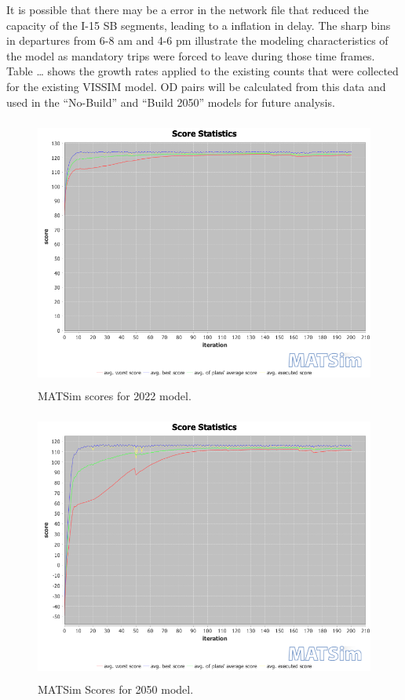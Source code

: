 \documentclass[
  letterpaper,
  DIV=11,
  numbers=noendperiod]{scrartcl}
\begin{document}
It is possible that there may be a error in the network file that
reduced the capacity of the I-15 SB segments, leading to a inflation in
delay. The sharp bins in departures from 6-8 am and 4-6 pm illustrate
the modeling characteristics of the model as mandatory trips were forced
to leave during those time frames. Table \ldots{} shows the growth rates
applied to the existing counts that were collected for the existing
VISSIM model. OD pairs will be calculated from this data and used in the
``No-Build'' and ``Build 2050'' models for future analysis.

\begin{figure}

{\centering \includegraphics[width=\textwidth,height=3.5in]{figures/matsim/scorestats2022.png}

}

\caption{\label{fig-2022-scores}MATSim scores for 2022 model.}

\end{figure}

\begin{figure}

{\centering \includegraphics[width=\textwidth,height=3.5in]{figures/matsim/scorestats2050.png}

}

\caption{\label{fig-2050-scores}MATSim Scores for 2050 model.}

\end{figure}
\end{document}
